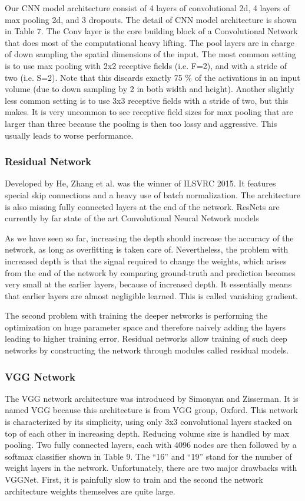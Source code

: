 \documentclass[10pt,twocolumn]{article}
\begin{document}
\par 
Our CNN model architecture consist of 4 layers of convolutional 2d, 4 layers of max pooling 2d, and 3 dropouts. The detail of CNN model architecture is shown in Table 7. The Conv layer is the core building block of a Convolutional Network that does most of the computational heavy lifting. The pool layers are in charge of down sampling the spatial dimensions of the input. The most common setting is to use max pooling with 2x2 receptive fields (i.e. F=2), and with a stride of two (i.e. S=2). Note that this discards exactly 75 \% of the activations in an input volume (due to down sampling by 2 in both width and height). Another slightly less common setting is to use 3x3 receptive fields with a stride of two, but this makes. It is very uncommon to see receptive field sizes for max pooling that are larger than three because the pooling is then too lossy and aggressive. This usually leads to worse performance.
\subsubsection{Residual Network}
Developed by He, Zhang et al. was the winner of ILSVRC 2015\cite{he2016deep}. It features special skip connections and a heavy use of batch normalization. The architecture is also missing fully connected layers at the end of the network. ResNets are currently by far state of the art Convolutional Neural Network models
\par
As we have seen so far, increasing the depth should increase the accuracy of the network, as long as overfitting is taken care of. Nevertheless, the problem with increased depth is that the signal required to change the weights, which arises from the end of the network by comparing ground-truth and prediction becomes very small at the earlier layers, because of increased depth. It essentially means that earlier layers are almost negligible learned. This is called vanishing gradient.
\par 
The second problem with training the deeper networks is performing the optimization on huge parameter space and therefore naively adding the layers leading to higher training error. Residual networks allow training of such deep networks by constructing the network through modules called residual models.
\subsubsection{VGG Network}
The VGG network architecture was introduced by Simonyan and Zisserman\cite{simonyan2014very}. It is named VGG because this architecture is from VGG group, Oxford. This network is characterized by its simplicity, using only 3x3 convolutional layers stacked on top of each other in increasing depth. Reducing volume size is handled by max pooling. Two fully connected layers, each with 4096 nodes are then followed by a softmax classifier shown in Table 9. The “16” and “19” stand for the number of weight layers in the network. Unfortunately, there are two major drawbacks with VGGNet. First, it is painfully slow to train and the second the network architecture weights themselves are quite large.
\end{document}
